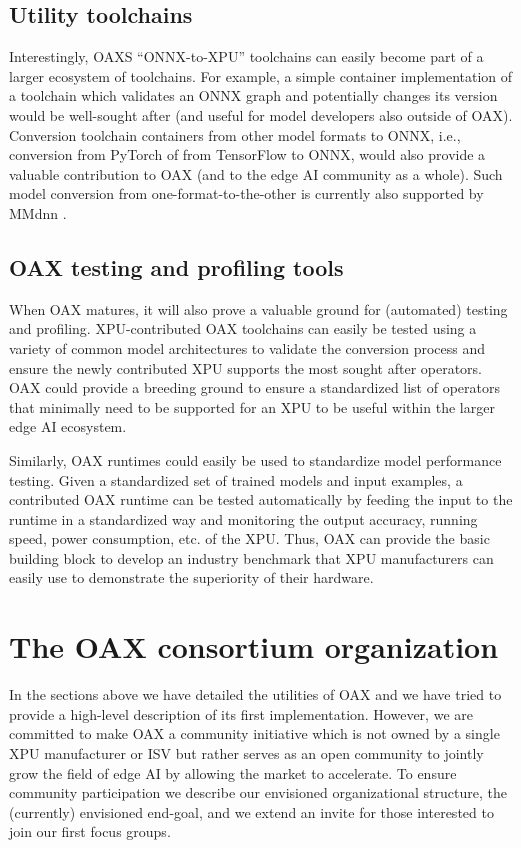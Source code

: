 \documentclass{article}
\begin{document}
\subsection{Utility toolchains}

Interestingly, OAXS ``ONNX-to-XPU'' toolchains can easily become part of a larger ecosystem of toolchains. For example, a simple container implementation of a toolchain which validates an ONNX graph and potentially changes its version would be well-sought after (and useful for model developers also outside of OAX). Conversion toolchain containers from other model formats to ONNX, i.e., conversion from PyTorch of from TensorFlow to ONNX, would also provide a valuable contribution to OAX (and to the edge AI community as a whole). Such model conversion from one-format-to-the-other is currently also supported by MMdnn \cite{MMdnn}. 

\subsection{OAX testing and profiling tools}

When OAX matures, it will also prove a valuable ground for (automated) testing and profiling. XPU-contributed OAX toolchains can easily be tested using a variety of common model architectures to validate the conversion process and ensure the newly contributed XPU supports the most sought after operators. OAX could provide a breeding ground to ensure a standardized list of operators that minimally need to be supported for an XPU to be useful within the larger edge AI ecosystem.

Similarly, OAX runtimes could easily be used to standardize model performance testing. Given a standardized set of trained models and input examples, a contributed OAX runtime can be tested automatically by feeding the input to the runtime in a standardized way and monitoring the output accuracy, running speed, power consumption, etc. of the XPU. Thus, OAX can provide the basic building block to develop an industry benchmark that XPU manufacturers can easily use to demonstrate the superiority of their hardware.

\section{The OAX consortium organization}
\label{sec:oax-organization}

In the sections above we have detailed the utilities of OAX and we have tried to provide a high-level description of its first implementation. However, we are committed to make OAX a community initiative which is not owned by a single XPU manufacturer or ISV but rather serves as an open community to jointly grow the field of edge AI by allowing the market to accelerate. To ensure community participation we describe our envisioned organizational structure, the (currently) envisioned end-goal, and we extend an invite for those interested to join our first focus groups.
\end{document}
